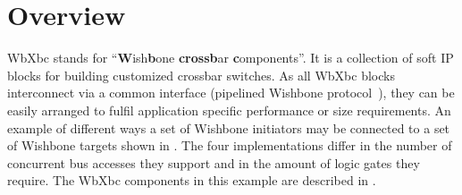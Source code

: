 
\section{Overview}
\label{overview}

WbXbc stands for ``\textbf{W}ish\textbf{b}one \textbf{cross}\textbf{b}ar \textbf{c}omponents''.
It is a collection of soft IP blocks for building customized crossbar switches.
As all WbXbc blocks interconnect via a common interface (pipelined Wishbone protocol~\cite{wishbone}),
they can be easily arranged to fulfil application specific performance or size requirements.
An example of different ways a set of Wishbone initiators may be connected to a set of Wishbone targets
shown in . The four implementations differ in the number of concurrent bus accesses
they support and in the amount of logic gates they require. The WbXbc components in this example are
described in .

